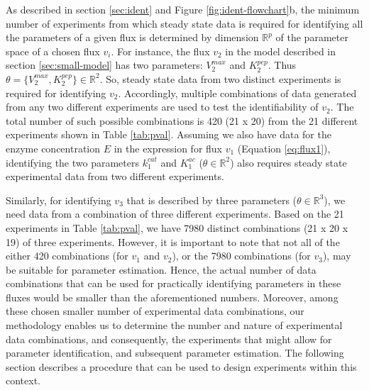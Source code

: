 \documentclass[10pt]{article}
\begin{document}
	As described in section \ref{sec:ident} and Figure \ref{fig:ident-flowchart}b, the minimum number of experiments from which steady state data is required for identifying all the parameters of a given flux is determined by dimension $\mathbb{R}^p$ of the parameter space of a chosen flux $v_i$. For instance, the flux $v_2$ in the model described in section \ref{sec:small-model} has two parameters: $V_2^{max}$ and $K_2^{pep}$. Thus $\theta = \{V_2^{max}, K_2^{pep}\} \in \mathbb{R}^2$. So, steady state data from two distinct experiments is required for identifying $v_2$. Accordingly, multiple combinations of data generated from any two different experiments are used to test the identifiability of $v_2$. The total number of such possible combinations is 420 (21 x 20) from the 21 different experiments shown in Table \ref{tab:pval}. Assuming we also have data for the enzyme concentration $E$ in the expression for flux $v_1$ (Equation \ref{eq:flux1}), identifying the two parameters $k_1^{cat}$ and $K_1^{ac}$ ($\theta \in \mathbb{R}^2$) also requires steady state experimental data from two different experiments.
	
	Similarly, for identifying $v_3$ that is described by three parameters ($\theta \in \mathbb{R}^3$), we need data from a combination of three different experiments. Based on the 21 experiments in Table \ref{tab:pval}, we have 7980 distinct combinations (21 x 20 x 19) of three experiments. However, it is important to note that not all of the either 420 combinations (for $v_1$ and $v_2$), or the 7980 combinations (for $v_3$), may be suitable for parameter estimation. Hence, the actual number of data combinations that can be used for practically identifying parameters in these fluxes would be smaller than the aforementioned numbers. Moreover, among these chosen smaller number of experimental data combinations, our methodology enables us to determine the number and nature of experimental data combinations, and consequently, the experiments that might allow for parameter identification, and subsequent parameter estimation. The following section describes a procedure that can be used to design experiments within this context.	
	
\end{document}
